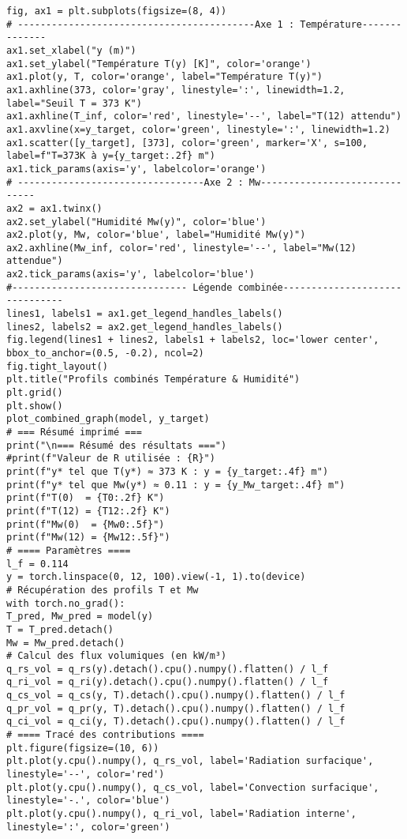 \documentclass[12pt, oneside]{report} %
\theoremstyle{definition}
\theoremstyle{remark}
\begin{document}
\begin{lstlisting}[style=pythonstyle]
fig, ax1 = plt.subplots(figsize=(8, 4))
# ------------------------------------------Axe 1 : Température--------------
ax1.set_xlabel("y (m)")
ax1.set_ylabel("Température T(y) [K]", color='orange')
ax1.plot(y, T, color='orange', label="Température T(y)")
ax1.axhline(373, color='gray', linestyle=':', linewidth=1.2, label="Seuil T = 373 K")
ax1.axhline(T_inf, color='red', linestyle='--', label="T(12) attendu")
ax1.axvline(x=y_target, color='green', linestyle=':', linewidth=1.2)
ax1.scatter([y_target], [373], color='green', marker='X', s=100, label=f"T=373K à y={y_target:.2f} m")
ax1.tick_params(axis='y', labelcolor='orange')
# ---------------------------------Axe 2 : Mw------------------------------
ax2 = ax1.twinx()
ax2.set_ylabel("Humidité Mw(y)", color='blue')
ax2.plot(y, Mw, color='blue', label="Humidité Mw(y)")
ax2.axhline(Mw_inf, color='red', linestyle='--', label="Mw(12) attendue")
ax2.tick_params(axis='y', labelcolor='blue')
#------------------------------- Légende combinée-------------------------------
lines1, labels1 = ax1.get_legend_handles_labels()
lines2, labels2 = ax2.get_legend_handles_labels()
fig.legend(lines1 + lines2, labels1 + labels2, loc='lower center', bbox_to_anchor=(0.5, -0.2), ncol=2)
fig.tight_layout()
plt.title("Profils combinés Température & Humidité")
plt.grid()
plt.show()
plot_combined_graph(model, y_target)
# === Résumé imprimé ===
print("\n=== Résumé des résultats ===")
#print(f"Valeur de R utilisée : {R}")
print(f"y* tel que T(y*) ≈ 373 K : y = {y_target:.4f} m")
print(f"y* tel que Mw(y*) ≈ 0.11 : y = {y_Mw_target:.4f} m")
print(f"T(0)  = {T0:.2f} K")
print(f"T(12) = {T12:.2f} K")
print(f"Mw(0)  = {Mw0:.5f}")
print(f"Mw(12) = {Mw12:.5f}")
# ==== Paramètres ====
l_f = 0.114 
y = torch.linspace(0, 12, 100).view(-1, 1).to(device)
# Récupération des profils T et Mw
with torch.no_grad():
T_pred, Mw_pred = model(y)
T = T_pred.detach()
Mw = Mw_pred.detach()
# Calcul des flux volumiques (en kW/m³)
q_rs_vol = q_rs(y).detach().cpu().numpy().flatten() / l_f 
q_ri_vol = q_ri(y).detach().cpu().numpy().flatten() / l_f 
q_cs_vol = q_cs(y, T).detach().cpu().numpy().flatten() / l_f 
q_pr_vol = q_pr(y, T).detach().cpu().numpy().flatten() / l_f 
q_ci_vol = q_ci(y, T).detach().cpu().numpy().flatten() / l_f 
# ==== Tracé des contributions ====
plt.figure(figsize=(10, 6))
plt.plot(y.cpu().numpy(), q_rs_vol, label='Radiation surfacique', linestyle='--', color='red')
plt.plot(y.cpu().numpy(), q_cs_vol, label='Convection surfacique', linestyle='-.', color='blue')
plt.plot(y.cpu().numpy(), q_ri_vol, label='Radiation interne', linestyle=':', color='green')

\end{lstlisting}
\end{document}
